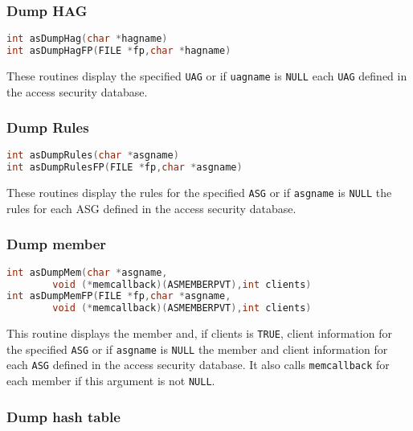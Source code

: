 \subsubsection{Dump HAG}

\begin{lstlisting}[language=C]
int asDumpHag(char *hagname)
int asDumpHagFP(FILE *fp,char *hagname)
\end{lstlisting}

These routines display the specified \verb|UAG| or if \verb|uagname| is \verb|NULL| each \verb|UAG| defined in the access security database.

\subsubsection{Dump Rules}

\begin{lstlisting}[language=C]
int asDumpRules(char *asgname)
int asDumpRulesFP(FILE *fp,char *asgname)
\end{lstlisting}

These routines display the rules for the specified \verb|ASG| or if \verb|asgname| is \verb|NULL| the rules for each ASG defined in the 
access security database.

\subsubsection{Dump member}

\begin{lstlisting}[language=C]
int asDumpMem(char *asgname,
        void (*memcallback)(ASMEMBERPVT),int clients)
int asDumpMemFP(FILE *fp,char *asgname,
        void (*memcallback)(ASMEMBERPVT),int clients)
\end{lstlisting}

This routine displays the member and, if clients is \verb|TRUE|, client information for the specified \verb|ASG| or if \verb|asgname| is \verb|NULL| the member and client information for each \verb|ASG| defined in the access security database.
It also calls \verb|memcallback| for each member if this argument is not \verb|NULL|.

\subsubsection{Dump hash table}

